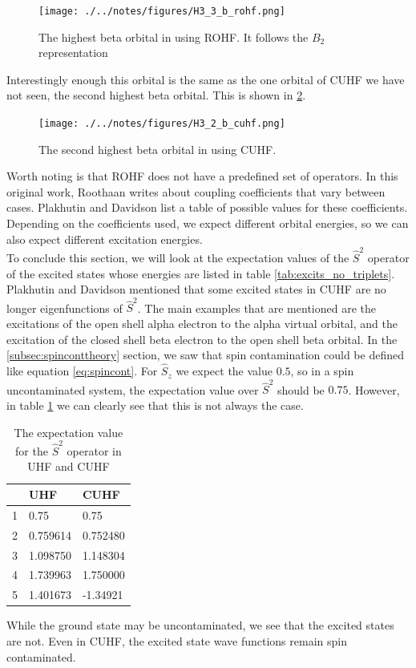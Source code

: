 \documentclass[twoside,twocolumn,9pt]{article}
\begin{document}
\begin{figure}[h]
  \texttt{[image: ./../notes/figures/H3\_3\_b\_rohf.png]}
  \caption{The highest beta orbital in  using ROHF. It follows the $B_2$ representation}
  \label{fig:rohforbitalb2}
\end{figure}

Interestingly enough this orbital is the same as the one orbital of CUHF we have not seen, the second highest beta orbital. This is shown in 
\ref{fig:cuhforbitalb2}.

\begin{figure}
  \texttt{[image: ./../notes/figures/H3\_2\_b\_cuhf.png]}
  \caption{The second highest beta orbital in  using CUHF.}
  \label{fig:cuhforbitalb2}
\end{figure}

Worth noting is that ROHF does not have a predefined set of operators. In this original work, Roothaan writes about coupling coefficients that vary between cases\cite{Roothaan1960}.
Plakhutin and Davidson list a table of possible values for these coefficients\cite{Plakhutin2014}. Depending on the coefficients used, we expect different orbital energies, so we can also
expect different excitation energies. \\

To conclude this section, we will look at the expectation values of the $\hat{S}^2$ operator of the excited states whose energies are listed in table \ref{tab:excits_no_triplets}. 
Plakhutin and Davidson mentioned that some excited states in CUHF are no longer eigenfunctions of $\hat{S}^2$\cite{Plakhutin2014}. The main examples that are mentioned are the
excitations of the open shell alpha electron to the alpha virtual orbital, and the excitation of the closed shell beta electron to the open shell beta orbital. In the 
\ref{subsec:spinconttheory} section, we saw that spin contamination could be defined like equation \eqref{eq:spincont}. For $\hat{S}_z$ we expect the value $0.5$\cite{Acke2019}, so in a 
spin uncontaminated system, the expectation value over $\hat{S}^2$ should be $0.75$. However, in table \ref{tab:spincon} we can clearly see that this is not always the case.

\begin{table}[h]
  \caption{The expectation value for the $\hat{S}^2$ operator in UHF and CUHF}
  \label{tab:spincon}
  \begin{tabular}{l|l|l}
    & UHF       & CUHF      \\
  \hline
  1 & 0.75 & 0.75 \\
  2 & 0.759614 & 0.752480 \\
  3 & 1.098750 & 1.148304 \\
  4 & 1.739963 & 1.750000 \\
  5 & 1.401673 & -1.34921
\end{tabular}
\end{table}
While the ground state may be uncontaminated, we see that the excited states are not. Even in CUHF, the excited state wave functions remain spin contaminated.
\end{document}
